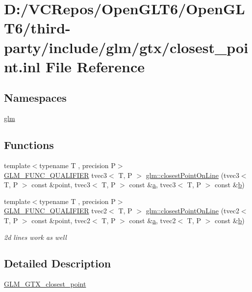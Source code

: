 \hypertarget{closest__point_8inl}{}\section{D\+:/\+V\+C\+Repos/\+Open\+G\+L\+T6/\+Open\+G\+L\+T6/third-\/party/include/glm/gtx/closest\+\_\+point.inl File Reference}
\label{closest__point_8inl}
\subsection*{Namespaces}
\begin{DoxyCompactItemize}
\item 
 \mbox{\hyperlink{namespaceglm}{glm}}
\end{DoxyCompactItemize}
\subsection*{Functions}
\begin{DoxyCompactItemize}
\item 
{\footnotesize template$<$typename T , precision P$>$ }\\\mbox{\hyperlink{setup_8hpp_a33fdea6f91c5f834105f7415e2a64407}{G\+L\+M\+\_\+\+F\+U\+N\+C\+\_\+\+Q\+U\+A\+L\+I\+F\+I\+ER}} tvec3$<$ T, P $>$ \mbox{\hyperlink{group__gtx__closest__point_gac26353282a8213e469f5e33560c1200f}{glm\+::closest\+Point\+On\+Line}} (tvec3$<$ T, P $>$ const \&point, tvec3$<$ T, P $>$ const \&\mbox{\hyperlink{glad_8h_ac8729153468b5dcf13f971b21d84d4e5}{a}}, tvec3$<$ T, P $>$ const \&\mbox{\hyperlink{glad_8h_a6eba317e3cf44d6d26c04a5a8f197dcb}{b}})
\item 
{\footnotesize template$<$typename T , precision P$>$ }\\\mbox{\hyperlink{setup_8hpp_a33fdea6f91c5f834105f7415e2a64407}{G\+L\+M\+\_\+\+F\+U\+N\+C\+\_\+\+Q\+U\+A\+L\+I\+F\+I\+ER}} tvec2$<$ T, P $>$ \mbox{\hyperlink{group__gtx__closest__point_gadc7010070bb0cacd284f560299b21660}{glm\+::closest\+Point\+On\+Line}} (tvec2$<$ T, P $>$ const \&point, tvec2$<$ T, P $>$ const \&\mbox{\hyperlink{glad_8h_ac8729153468b5dcf13f971b21d84d4e5}{a}}, tvec2$<$ T, P $>$ const \&\mbox{\hyperlink{glad_8h_a6eba317e3cf44d6d26c04a5a8f197dcb}{b}})
\begin{DoxyCompactList}\small\item\em 2d lines work as well \end{DoxyCompactList}\end{DoxyCompactItemize}


\subsection{Detailed Description}
\mbox{\hyperlink{group__gtx__closest__point}{G\+L\+M\+\_\+\+G\+T\+X\+\_\+closest\+\_\+point}} 